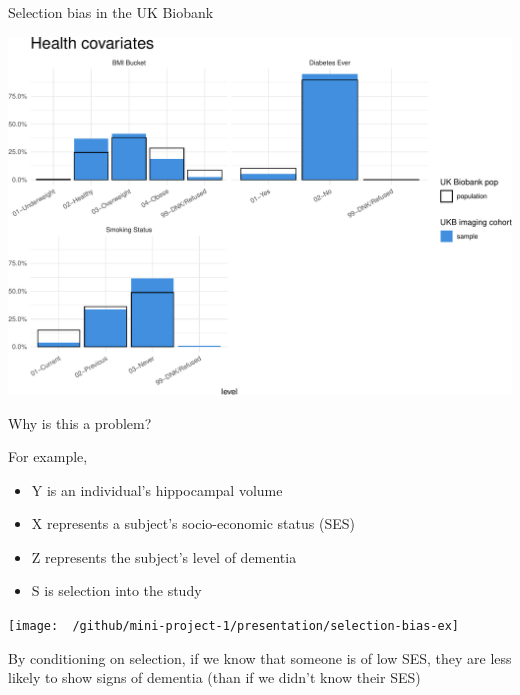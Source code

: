 \documentclass[
  ignorenonframetext,
]{beamer}
\providecommand{\tightlist}{%
  \setlength{\itemsep}{0pt}\setlength{\parskip}{0pt}}
\begin{document}
\begin{frame}{Selection bias in the UK Biobank}
\protect\hypertarget{selection-bias-in-the-uk-biobank-1}{}

\begin{center}\includegraphics[width=0.96\linewidth]{fmrib-deck-20191002_files/figure-beamer/plot-selection-bias-health-1} \end{center}

\end{frame}

\begin{frame}{Why is this a problem?}
\protect\hypertarget{why-is-this-a-problem}{}

For example,

\begin{itemize}
\tightlist
\item
  Y is an individual's hippocampal volume
\item
  X represents a subject's socio-economic status (SES)
\item
  Z represents the subject's level of dementia
\item
  S is selection into the study
\end{itemize}

\center

\texttt{[image: ~/github/mini-project-1/presentation/selection-bias-ex]}
\center

By conditioning on selection, if we know that someone is of low SES,
they are less likely to show signs of dementia (than if we didn't know
their SES)

\end{frame}
\end{document}
